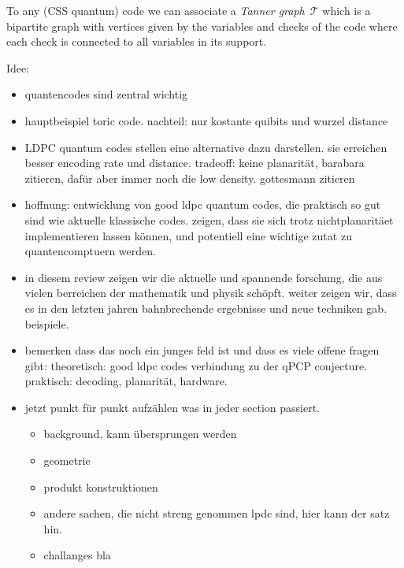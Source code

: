 To any (CSS quantum) code we can associate a \emph{Tanner graph}~$\mathcal{T}$ which is a bipartite graph with vertices given by the variables and checks of the code where each check is connected to all variables in its support.










Idee:
\begin{itemize}
    \item quantencodes sind zentral wichtig
    \item hauptbeispiel toric code. nachteil: nur kostante quibits und wurzel distance
    \item LDPC quantum codes stellen eine alternative dazu darstellen. sie erreichen besser encoding rate und distance. tradeoff: keine planarität, barabara zitieren, dafür aber immer noch die low density. gottesmann zitieren
    \item hoffnung: entwicklung von good ldpc quantum codes, die praktisch so gut sind wie aktuelle klassische codes. zeigen, dass sie sich trotz nichtplanaritäet implementieren lassen können, und potentiell eine wichtige zutat zu quantencomptuern werden.
    \item in diesem review zeigen wir die aktuelle und spannende forschung, die aus vielen berreichen der mathematik und physik schöpft. weiter zeigen wir, dass es in den letzten jahren bahnbrechende ergebnisse und neue techniken gab. beispiele.
    \item bemerken dass das noch ein junges feld ist und dass es viele offene fragen gibt: theoretisch: good ldpc codes verbindung zu der qPCP conjecture. praktisch: decoding, planarität, hardware.
    \item jetzt punkt für punkt aufzählen was in jeder section passiert.
    \begin{itemize}
        \item background, kann übersprungen werden
        \item geometrie
        \item produkt konstruktionen
        \item andere sachen, die nicht streng genommen lpdc sind, hier kann der satz hin.
        \item challanges bla
    \end{itemize}
\end{itemize}